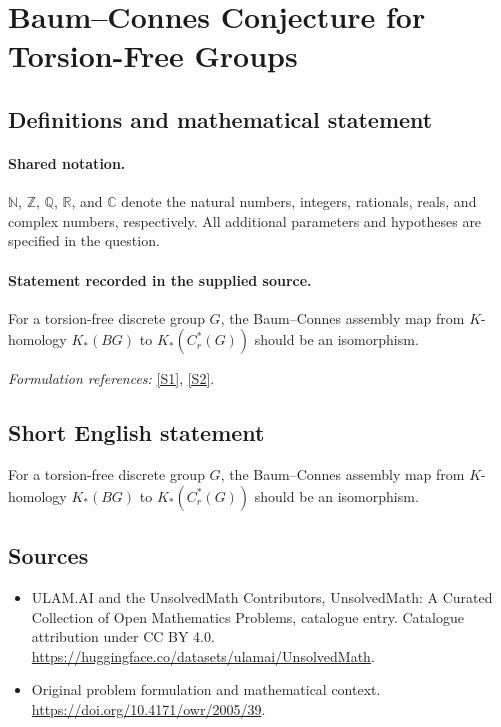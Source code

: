\documentclass[11pt]{article}
\newcommand{\sref}[2]{\hyperlink{source:#1:#2}{[S#2]}}
\begin{document}
\section{Baum–Connes Conjecture for Torsion-Free Groups}\label{statement}

\subsection{Definitions and mathematical statement}

\paragraph{Shared notation.}$\mathbb N$, $\mathbb Z$, $\mathbb Q$, $\mathbb R$, and $\mathbb C$ denote the natural numbers, integers, rationals, reals, and complex numbers, respectively. All additional parameters and hypotheses are specified in the question.


\paragraph{Statement recorded in the supplied source.}
For a torsion-free discrete group $G$, the Baum–Connes assembly map from $K$-homology $K_*(BG)$ to $K_*(C_r^*(G))$ should be an isomorphism.
\par\smallskip\textit{Formulation references:} \sref{statement}{1}, \sref{statement}{2}.
\subsection{Short English statement}
For a torsion-free discrete group $G$, the Baum–Connes assembly map from $K$-homology $K_*(BG)$ to $K_*(C_r^*(G))$ should be an isomorphism.
\subsection{Sources}
\begin{itemize}
\item[\hypertarget{source:statement:1}{S1}] ULAM.AI and the UnsolvedMath Contributors, UnsolvedMath: A Curated Collection of Open Mathematics Problems, catalogue entry. Catalogue attribution under CC BY 4.0.
\url{https://huggingface.co/datasets/ulamai/UnsolvedMath}.
\item[\hypertarget{source:statement:2}{S2}] Original problem formulation and mathematical context.
\url{https://doi.org/10.4171/owr/2005/39}.
\end{itemize}
\label{end:statement}
\end{document}
